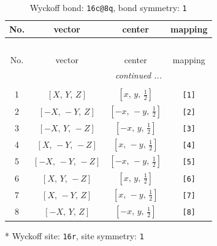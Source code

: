 \documentclass[fleqn,8pt]{jsarticle}
\begin{document}
\renewcommand{\arraystretch}{1.2}
\begin{longtable}{cccc}
\caption{Wyckoff bond: {\tt 16c@8q}, bond symmetry: {\tt 1}}
 \\
 \hline \hline
No. & vector & center & mapping \\ \hline \endfirsthead

\multicolumn{3}{l}{\tablename\ \thetable{}} \\
 \hline \hline
No. & vector & center & mapping \\ \hline \endhead

 \hline \hline
\multicolumn{3}{r}{\footnotesize\it continued ...} \\ \endfoot

 \hline \hline
\multicolumn{3}{r}{} \\ \endlastfoot

1 & $\left[ X,\, Y,\, Z \right]$ & $\left[ x,\, y,\, \frac{1}{2} \right]$ & {\tt [1]} \\ \hline
2 & $\left[ - X,\, - Y,\, Z \right]$ & $\left[ - x,\, - y,\, \frac{1}{2} \right]$ & {\tt [2]} \\ \hline
3 & $\left[ - X,\, Y,\, - Z \right]$ & $\left[ - x,\, y,\, \frac{1}{2} \right]$ & {\tt [3]} \\ \hline
4 & $\left[ X,\, - Y,\, - Z \right]$ & $\left[ x,\, - y,\, \frac{1}{2} \right]$ & {\tt [4]} \\ \hline
5 & $\left[ - X,\, - Y,\, - Z \right]$ & $\left[ - x,\, - y,\, \frac{1}{2} \right]$ & {\tt [5]} \\ \hline
6 & $\left[ X,\, Y,\, - Z \right]$ & $\left[ x,\, y,\, \frac{1}{2} \right]$ & {\tt [6]} \\ \hline
7 & $\left[ X,\, - Y,\, Z \right]$ & $\left[ x,\, - y,\, \frac{1}{2} \right]$ & {\tt [7]} \\ \hline
8 & $\left[ - X,\, Y,\, Z \right]$ & $\left[ - x,\, y,\, \frac{1}{2} \right]$ & {\tt [8]} \\
\end{longtable}
* Wyckoff site: {\tt 16r}, site symmetry: {\tt 1}
\renewcommand{\arraystretch}{1.2}
\end{document}
